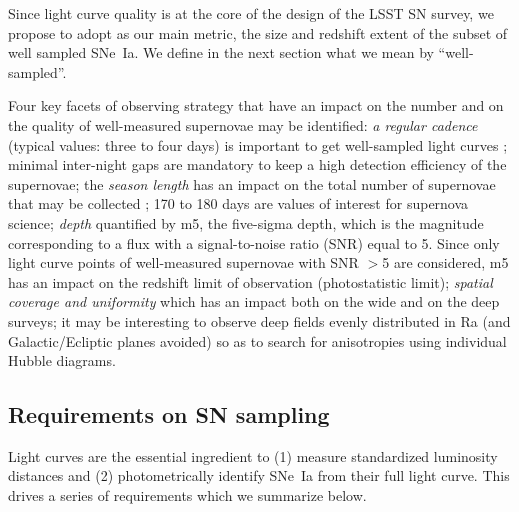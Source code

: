\documentclass [11pt,a4paper]{article}
\begin{document}
Since light curve quality is at the core of the design of the LSST SN
survey, we propose to adopt as our main metric, the size and redshift
extent of the subset of well sampled SNe~Ia.  We define in the next
section what we mean by ``well-sampled''.


Four key facets of observing strategy that have an impact on the number and on the quality of well-measured supernovae may be identified: {\it a regular cadence} (typical values: three to four days) is important to get well-sampled light curves ; minimal inter-night gaps are mandatory to keep a high detection efficiency of the supernovae; the {\it season length} has an impact on the total number of supernovae that may be collected ; 170 to 180 days are values of interest for supernova science; {\it depth} quantified by m5, the five-sigma depth, which is the magnitude corresponding to a flux with a signal-to-noise ratio (SNR) equal to 5. Since only light curve points of well-measured supernovae with SNR $>$5 are considered, m5 has an impact on the redshift limit of observation (photostatistic limit); {\it spatial coverage and uniformity} which has an impact both on the wide and on the deep surveys; it may be interesting to observe deep fields evenly distributed in Ra (and Galactic/Ecliptic planes avoided) so as to search for anisotropies using individual Hubble diagrams.


\subsection{Requirements on SN sampling}
\label{sec:sn_sampling_requirements}

Light curves are the essential ingredient to (1) measure standardized
luminosity distances and (2) photometrically identify SNe~Ia from
their full light curve. This drives a series of requirements which we
summarize below.
\end{document}
